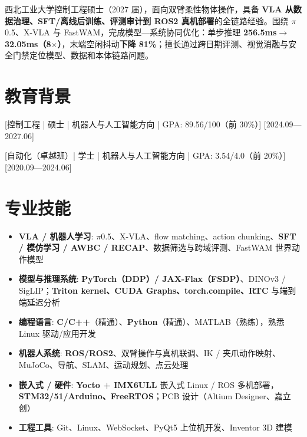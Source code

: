 \documentclass{resume-photo}
\newcommand{\hl}[1]{\textbf{\textcolor{hlred}{#1}}}
\begin{document}

\ResumeTitle

\noindent 西北工业大学控制工程硕士（2027 届），面向双臂柔性物体操作，具备 \hl{VLA 从数据治理、SFT/离线后训练、评测审计到 ROS2 真机部署}的全链路经验。围绕 $\pi$0.5、X-VLA 与 FastWAM，完成模型—系统协同优化：单步推理 \hl{256.5ms$\rightarrow$32.05ms（8$\times$）}，末端空闲抖动\hl{下降 81\%}；擅长通过跨日期评测、视觉消融与安全门禁定位模型、数据和本体链路问题。

\section{教育背景}
\ResumeItem{西北工业大学\hl{（985）}}
[\textnormal{控制工程 | 硕士 | 机器人与人工智能方向 | GPA: 89.56/100（前 30\%）}]
[2024.09—2027.06]

\ResumeItem{郑州大学\hl{（211）}}
[\textnormal{自动化（卓越班）| 学士 | 机器人与人工智能方向 | GPA: 3.54/4.0（前 20\%）}]
[2020.09—2024.06]

\section{专业技能}
\begin{itemize}
  \item \textbf{VLA / 机器人学习}: $\pi$0.5、X-VLA、flow matching、action chunking、\hl{SFT / 模仿学习 / AWBC / RECAP}、数据筛选与跨域评测、FastWAM 世界动作模型
  \item \textbf{模型与推理系统}: \hl{PyTorch（DDP）/ JAX-Flax（FSDP）}、DINOv3 / SigLIP；\hl{Triton kernel、CUDA Graphs、torch.compile、RTC} 与端到端延迟分析
  \item \textbf{编程语言}: \hl{C/C++}（精通）、\hl{Python}（精通）、MATLAB（熟练），熟悉 Linux 驱动/应用开发
  \item \textbf{机器人系统}: \hl{ROS/ROS2}、双臂操作与真机联调、IK / 夹爪动作映射、MuJoCo、导航、SLAM、运动规划、点云处理
  \item \textbf{嵌入式 / 硬件}: \hl{Yocto + IMX6ULL} 嵌入式 Linux / ROS 多机部署，\hl{STM32/51/Arduino、FreeRTOS}；PCB 设计（Altium Designer、嘉立创）
  \item \textbf{工程工具}: Git、Linux、WebSocket、PyQt5 上位机开发、Inventor 3D 建模
\end{itemize}
\end{document}
